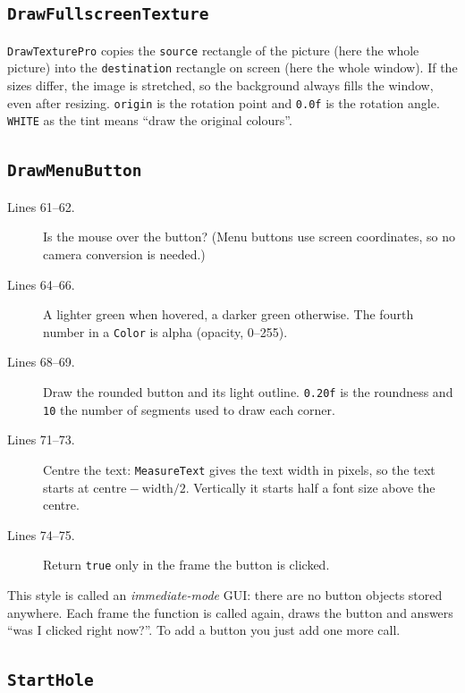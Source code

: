\documentclass[11pt,a4paper]{article}
\newcommand{\code}[3]{}
\begin{document}
\subsection{\texttt{DrawFullscreenTexture}}

\code{main.c}{50}{56}

\texttt{DrawTexturePro} copies the \texttt{source} rectangle of the picture (here the whole picture) into the
\texttt{destination} rectangle on screen (here the whole window). If the sizes differ, the image is stretched, so
the background always fills the window, even after resizing. \texttt{origin} is the rotation point and
\texttt{0.0f} is the rotation angle. \texttt{WHITE} as the tint means ``draw the original colours''.

\subsection{\texttt{DrawMenuButton}}

\code{main.c}{59}{76}

\begin{description}
  \item[Lines 61--62.] Is the mouse over the button? (Menu buttons use screen coordinates, so no camera conversion is
  needed.)
  \item[Lines 64--66.] A lighter green when hovered, a darker green otherwise. The fourth number in a \texttt{Color} is
  alpha (opacity, 0--255).
  \item[Lines 68--69.] Draw the rounded button and its light outline. \texttt{0.20f} is the roundness and \texttt{10}
  the number of segments used to draw each corner.
  \item[Lines 71--73.] Centre the text: \texttt{MeasureText} gives the text width in pixels, so the text starts at
  $\text{centre} - \text{width}/2$. Vertically it starts half a font size above the centre.
  \item[Lines 74--75.] Return \texttt{true} only in the frame the button is clicked.
\end{description}

This style is called an \emph{immediate-mode} GUI: there are no button objects stored anywhere. Each frame the
function is called again, draws the button and answers ``was I clicked right now?''. To add a button you just add one
more call.

\subsection{\texttt{StartHole}}
\end{document}
